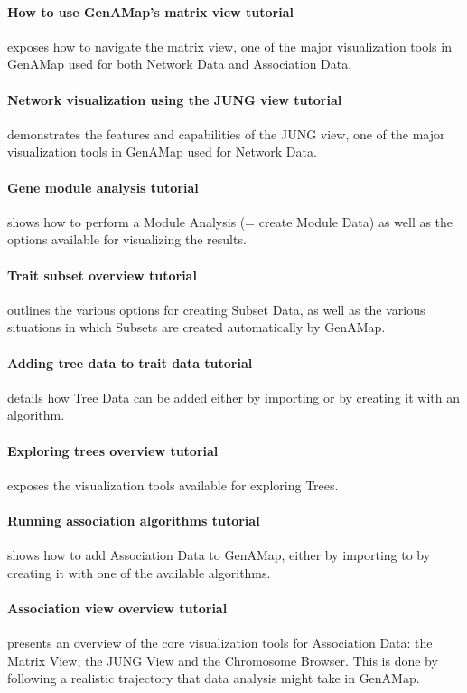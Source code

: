 \documentclass{article}
\begin{document}
\begin{appendices}
\paragraph{How to use GenAMap's matrix view tutorial} exposes how to navigate the matrix view, one of the major visualization tools in GenAMap used for both Network Data and Association Data.
\paragraph{Network visualization using the JUNG view tutorial} demonstrates the features and capabilities of the JUNG view, one of the major visualization tools in GenAMap used for Network Data.
\paragraph{Gene module analysis tutorial} shows how to perform a Module Analysis (= create Module Data) as well as the options available for visualizing the results.
\paragraph{Trait subset overview tutorial} outlines the various options for creating Subset Data, as well as the various situations in which Subsets are created automatically by GenAMap.  
\paragraph{Adding tree data to trait data tutorial} details how Tree Data can be added either by importing or by creating it with an algorithm.
\paragraph{Exploring trees overview tutorial} exposes the visualization tools available for exploring Trees.
\paragraph{Running association algorithms tutorial} shows how to add Association Data to GenAMap, either by importing to by creating it with one of the available algorithms.
\paragraph{Association view overview tutorial} presents an overview of the core visualization tools for Association Data: the Matrix View, the JUNG View and the Chromosome Browser. This is done by following a realistic trajectory that data analysis might take in GenAMap.

\end{appendices}
\end{document}

